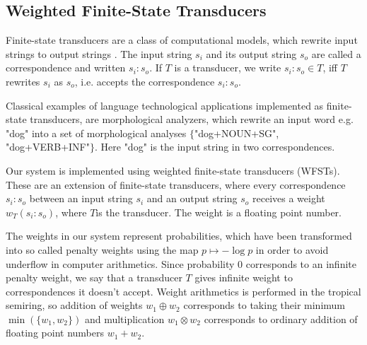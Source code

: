 \documentclass[a4paper,conference]{IEEEtran}
\begin{document}
\subsection{Weighted Finite-State Transducers}


Finite-state transducers are a class of computational models, which
rewrite input strings to output strings \cite{beesley/2003}. The input
string $s_i$ and its output string $s_o$ are called a correspondence
and written $s_i\mathrm{:}s_o$. If $T$ is a transducer, we write
$s_i\mathrm{:}s_o \in T$, iff $T$ rewrites $s_i$ as $s_o$, i.e. accepts the correspondence $s_i\mathrm{:}s_o$.

Classical examples of language technological applications
implemented as finite-state transducers, are morphological analyzers,
which rewrite an input word e.g. "dog" into a set of morphological
analyses $\{$"dog+NOUN+SG", "dog+VERB+INF"$\}$. Here "dog" is the
input string in two correspondences.

Our system is implemented using weighted finite-state transducers
(WFSTs). These are an extension of finite-state transducers, where
every correspondence $s_i\mathrm{:}s_o$ between an input string $s_i$
and an output string $s_o$ receives a weight $w_T(s_i\mathrm{:}s_o)$,
where $T$is the transducer. The weight is a floating point number. 

The weights in our system represent probabilities, which have been
transformed into so called penalty weights using the map $p \mapsto
-\log p$ in order to avoid underflow in computer arithmetics. Since
probability $0$ corresponds to an infinite penalty weight, we say that
a transducer $T$ gives infinite weight to correspondences it doesn't
accept. Weight arithmetics is performed in the tropical semiring, so
addition of weights $w_1 \oplus w_2$ corresponds to taking their
minimum $\min(\{w_1,w_2\})$ and multiplication $w_1 \otimes w_2$
corresponds to ordinary addition of floating point numbers $w_1 + w_2$.
\end{document}
